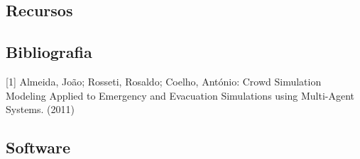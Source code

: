 \documentclass[12pt]{article}
\begin{document}
\begin{titlepage}
\section{Recursos}
\subsection{Bibliografia}
[1] Almeida, João; Rosseti, Rosaldo; Coelho, António: Crowd Simulation Modeling Applied to Emergency and Evacuation Simulations using Multi-Agent Systems. (2011)

\subsection{Software}

\end{titlepage}
\end{document}
